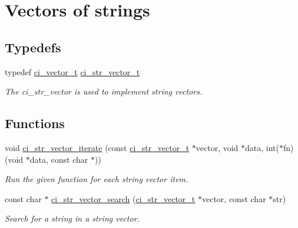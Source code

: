 \hypertarget{group__STR__VECTORS}{
\section{Vectors of strings}
\label{group__STR__VECTORS}
}
\subsection*{Typedefs}
\begin{DoxyCompactItemize}
\item 
typedef \hyperlink{group__VECTORS_ga911840034b768c5380eba22ad04d3c66}{ci\_\-vector\_\-t} \hyperlink{group__STR__VECTORS_ga6b0d497303a6f84dd117722d0d3d5458}{ci\_\-str\_\-vector\_\-t}
\begin{DoxyCompactList}\small\item\em The ci\_\-str\_\-vector is used to implement string vectors. \item\end{DoxyCompactList}\end{DoxyCompactItemize}
\subsection*{Functions}
\begin{DoxyCompactItemize}
\item 
void \hyperlink{group__STR__VECTORS_gacce606c651cf5cf8726027c2bb170faf}{ci\_\-str\_\-vector\_\-iterate} (const \hyperlink{group__STR__VECTORS_ga6b0d497303a6f84dd117722d0d3d5458}{ci\_\-str\_\-vector\_\-t} $\ast$vector, void $\ast$data, int($\ast$fn)(void $\ast$data, const char $\ast$))
\begin{DoxyCompactList}\small\item\em Run the given function for each string vector item. \item\end{DoxyCompactList}\item 
const char $\ast$ \hyperlink{group__STR__VECTORS_ga16b28bbe7a99831a6a86dafe7fb98b07}{ci\_\-str\_\-vector\_\-search} (\hyperlink{group__STR__VECTORS_ga6b0d497303a6f84dd117722d0d3d5458}{ci\_\-str\_\-vector\_\-t} $\ast$vector, const char $\ast$str)
\begin{DoxyCompactList}\small\item\em Search for a string in a string vector. \item\end{DoxyCompactList}\end{DoxyCompactItemize}


